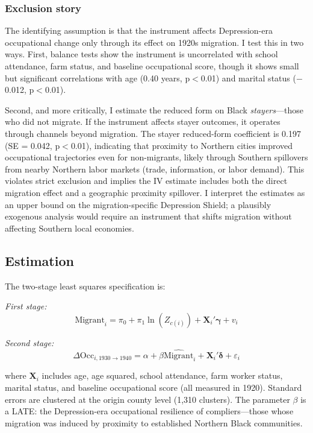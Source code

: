 \documentclass[12pt]{article}
\begin{document}
\subsubsection*{Exclusion story} The identifying assumption is that the instrument affects Depression-era occupational change only through its effect on 1920s migration. I test this in two ways. First, balance tests show the instrument is uncorrelated with school attendance, farm status, and baseline occupational score, though it shows small but significant correlations with age (0.40 years, p$<$0.01) and marital status ($-$0.012, p$<$0.01).

Second, and more critically, I estimate the reduced form on Black \textit{stayers}---those who did not migrate. If the instrument affects stayer outcomes, it operates through channels beyond migration. The stayer reduced-form coefficient is 0.197 (SE = 0.042, p$<$0.01), indicating that proximity to Northern cities improved occupational trajectories even for non-migrants, likely through Southern spillovers from nearby Northern labor markets (trade, information, or labor demand). This violates strict exclusion and implies the IV estimate includes both the direct migration effect and a geographic proximity spillover. I interpret the estimates as an upper bound on the migration-specific Depression Shield; a plausibly exogenous analysis would require an instrument that shifts migration without affecting Southern local economies.

\subsection{Estimation}

The two-stage least squares specification is:

\noindent\textit{First stage:}
\begin{equation}
\text{Migrant}_i = \pi_0 + \pi_1 \ln(Z_{c(i)}) + \mathbf{X}_i'\boldsymbol{\gamma} + v_i
\end{equation}

\noindent\textit{Second stage:}
\begin{equation}
\Delta \text{Occ}_{i,1930 \rightarrow 1940} = \alpha + \beta \widehat{\text{Migrant}}_i + \mathbf{X}_i'\boldsymbol{\delta} + \varepsilon_i
\end{equation}

where $\mathbf{X}_i$ includes age, age squared, school attendance, farm worker status, marital status, and baseline occupational score (all measured in 1920). Standard errors are clustered at the origin county level (1,310 clusters). The parameter $\beta$ is a LATE: the Depression-era occupational resilience of compliers---those whose migration was induced by proximity to established Northern Black communities.
\end{document}
